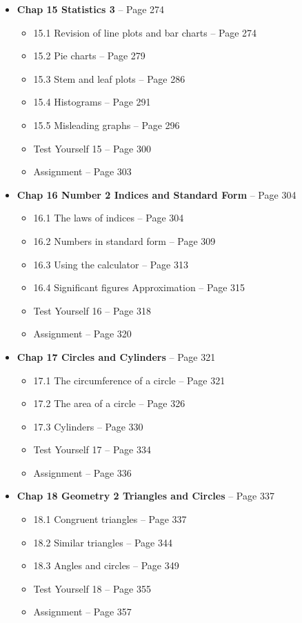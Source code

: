 \documentclass{article}
\begin{document}
\begin{itemize}
    \item \textbf{Chap 15 Statistics 3} -- Page 274
    \begin{itemize}
        \item 15.1 Revision of line plots and bar charts -- Page 274
        \item 15.2 Pie charts -- Page 279
        \item 15.3 Stem and leaf plots -- Page 286
        \item 15.4 Histograms -- Page 291
        \item 15.5 Misleading graphs -- Page 296
        \item Test Yourself 15 -- Page 300
        \item Assignment -- Page 303
    \end{itemize}

    \item \textbf{Chap 16 Number 2 Indices and Standard Form} -- Page 304
    \begin{itemize}
        \item 16.1 The laws of indices -- Page 304
        \item 16.2 Numbers in standard form -- Page 309
        \item 16.3 Using the calculator -- Page 313
        \item 16.4 Significant figures Approximation -- Page 315
        \item Test Yourself 16 -- Page 318
        \item Assignment -- Page 320
    \end{itemize}

    \item \textbf{Chap 17 Circles and Cylinders} -- Page 321
    \begin{itemize}
        \item 17.1 The circumference of a circle -- Page 321
        \item 17.2 The area of a circle -- Page 326
        \item 17.3 Cylinders -- Page 330
        \item Test Yourself 17 -- Page 334
        \item Assignment -- Page 336
    \end{itemize}

    \item \textbf{Chap 18 Geometry 2 Triangles and Circles} -- Page 337
    \begin{itemize}
        \item 18.1 Congruent triangles -- Page 337
        \item 18.2 Similar triangles -- Page 344
        \item 18.3 Angles and circles -- Page 349
        \item Test Yourself 18 -- Page 355
        \item Assignment -- Page 357
    \end{itemize}


\end{itemize}
\end{document}
